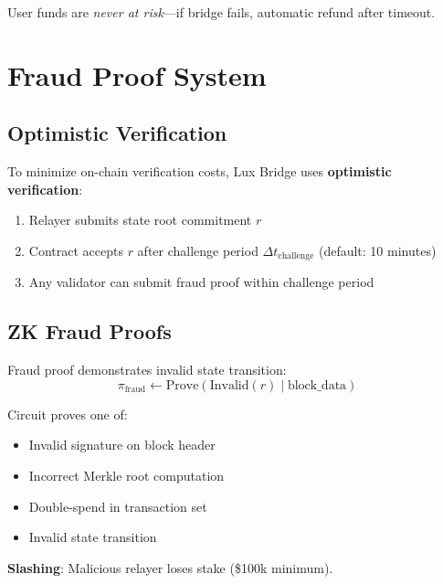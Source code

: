 \documentclass[11pt]{article}
\begin{document}
User funds are \emph{never at risk}---if bridge fails, automatic refund after timeout.

\section{Fraud Proof System}

\subsection{Optimistic Verification}

To minimize on-chain verification costs, Lux Bridge uses \textbf{optimistic verification}:

\begin{enumerate}
  \item Relayer submits state root commitment $r$
  \item Contract accepts $r$ after challenge period $\Delta t_{\text{challenge}}$ (default: 10 minutes)
  \item Any validator can submit fraud proof within challenge period
\end{enumerate}

\subsection{ZK Fraud Proofs}

Fraud proof demonstrates invalid state transition:
\begin{equation}
\pi_{\text{fraud}} \leftarrow \text{Prove}\left(\text{Invalid}(r) \mid \text{block\_data}\right)
\end{equation}

Circuit proves one of:
\begin{itemize}[leftmargin=1.1em]
  \item Invalid signature on block header
  \item Incorrect Merkle root computation
  \item Double-spend in transaction set
  \item Invalid state transition
\end{itemize}

\textbf{Slashing}: Malicious relayer loses stake (\$100k minimum).

\end{document}
